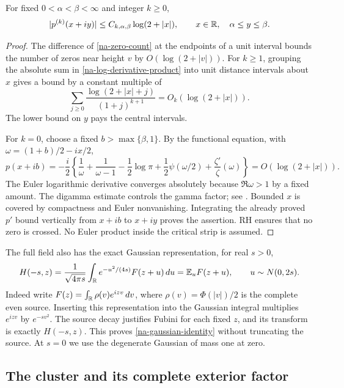 \begin{lemma}
\label{na-strip-lemma}
For fixed $0<\alpha<\beta<\infty$ and integer $k\ge0$,
\begin{equation}
 |p^{(k)}(x+iy)|\le C_{k,\alpha,\beta}\log(2+|x|),
 \qquad x\in\mathbb R,\quad \alpha\le y\le\beta.
 \label{na-strip-bound}
\end{equation}
\end{lemma}
\begin{proof}
The difference of \eqref{na-zero-count} at the endpoints of a unit
interval bounds the number of zeros near height $v$ by
$O(\log(2+|v|))$. For $k\ge1$, grouping the absolute sum in
\eqref{na-log-derivative-product} into unit distance intervals about $x$
gives a bound by a constant multiple of
\[
 \sum_{j\ge0}\frac{\log(2+|x|+j)}{(1+j)^{k+1}}
       =O_k(\log(2+|x|)).
\]
The lower bound on $y$ pays the central intervals.

For $k=0$, choose a fixed $b>\max\{\beta,1\}$. By the functional
equation, with $\omega=(1+b)/2-ix/2$,
\[
 p(x+ib)=-\frac i2\left\{
 \frac1\omega+\frac1{\omega-1}-\frac12\log\pi
 +\frac12\psi(\omega/2)+\frac{\zeta'}{\zeta}(\omega)
 \right\}=O(\log(2+|x|)).
\]
The Euler logarithmic derivative converges absolutely because
$\Re\omega>1$ by a fixed amount. The digamma estimate controls the gamma
factor; see \cite[\S\S5.11, 25.4]{DLMF}. Bounded $x$ is covered by
compactness and Euler nonvanishing. Integrating the already proved
$p'$ bound vertically from $x+ib$ to $x+iy$ proves the assertion.
RH ensures that no zero is crossed. No Euler product inside the
critical strip is assumed.
\end{proof}

The full field also has the exact Gaussian representation, for real $s>0$,
\begin{equation}
 H(-s,z)=\frac1{\sqrt{4\pi s}}\int_\mathbb R
              e^{-u^2/(4s)}F(z+u)\,du
        =\mathbb E_u F(z+u),\qquad u\sim N(0,2s).
 \label{na-gaussian-identity}
\end{equation}
Indeed write $F(z)=\int_\mathbb R\rho(v)e^{izv}\,dv$, where
$\rho(v)=\Phi(|v|)/2$ is the complete even source. Inserting this
representation into the Gaussian integral multiplies $e^{izv}$ by
$e^{-sv^2}$. The source decay justifies Fubini for each fixed $z$, and
its transform is exactly $H(-s,z)$. This proves
\eqref{na-gaussian-identity} without truncating the source. At $s=0$
we use the degenerate Gaussian of mass one at zero.

\subsection{The cluster and its complete exterior factor}
\label{na-exterior-subsection}

